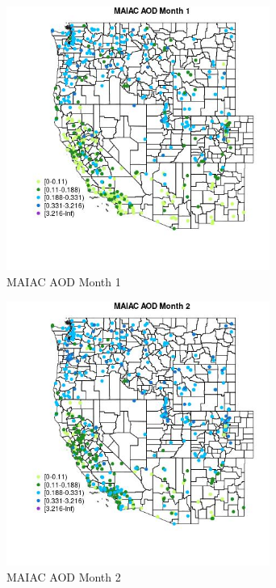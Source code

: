 \begin{figure} 
\centering  
\includegraphics[width=0.77\textwidth]{Code_Outputs/Report_ML_input_PM25_Step4_part_e_de_duplicated_aves_compiled_2019-05-14wNAs_MapObsMo1MAIAC_AOD.jpg} 
\caption{\label{fig:Report_ML_input_PM25_Step4_part_e_de_duplicated_aves_compiled_2019-05-14wNAsMapObsMo1MAIAC_AOD}MAIAC AOD Month 1} 
\end{figure} 
 

\begin{figure} 
\centering  
\includegraphics[width=0.77\textwidth]{Code_Outputs/Report_ML_input_PM25_Step4_part_e_de_duplicated_aves_compiled_2019-05-14wNAs_MapObsMo2MAIAC_AOD.jpg} 
\caption{\label{fig:Report_ML_input_PM25_Step4_part_e_de_duplicated_aves_compiled_2019-05-14wNAsMapObsMo2MAIAC_AOD}MAIAC AOD Month 2} 
\end{figure} 
 

